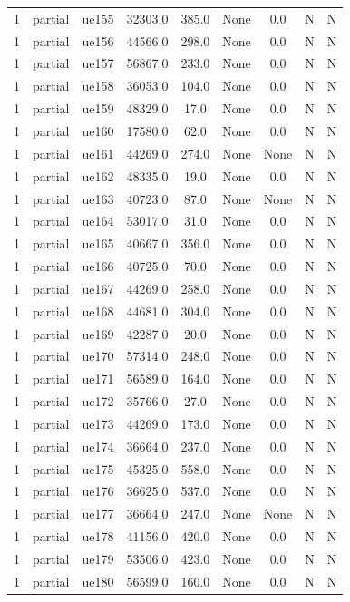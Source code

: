 \begin{table}[ht]
\begin{tabular}{|c|c|c|c|c|c|c|c|c|}
1 & partial & ue155 & 32303.0 & 385.0 & None & 0.0 & N & N \\
1 & partial & ue156 & 44566.0 & 298.0 & None & 0.0 & N & N \\
1 & partial & ue157 & 56867.0 & 233.0 & None & 0.0 & N & N \\
1 & partial & ue158 & 36053.0 & 104.0 & None & 0.0 & N & N \\
1 & partial & ue159 & 48329.0 & 17.0 & None & 0.0 & N & N \\
1 & partial & ue160 & 17580.0 & 62.0 & None & 0.0 & N & N \\
1 & partial & ue161 & 44269.0 & 274.0 & None & None & N & N \\
1 & partial & ue162 & 48335.0 & 19.0 & None & 0.0 & N & N \\
1 & partial & ue163 & 40723.0 & 87.0 & None & None & N & N \\
1 & partial & ue164 & 53017.0 & 31.0 & None & 0.0 & N & N \\
1 & partial & ue165 & 40667.0 & 356.0 & None & 0.0 & N & N \\
1 & partial & ue166 & 40725.0 & 70.0 & None & 0.0 & N & N \\
1 & partial & ue167 & 44269.0 & 258.0 & None & 0.0 & N & N \\
1 & partial & ue168 & 44681.0 & 304.0 & None & 0.0 & N & N \\
1 & partial & ue169 & 42287.0 & 20.0 & None & 0.0 & N & N \\
1 & partial & ue170 & 57314.0 & 248.0 & None & 0.0 & N & N \\
1 & partial & ue171 & 56589.0 & 164.0 & None & 0.0 & N & N \\
1 & partial & ue172 & 35766.0 & 27.0 & None & 0.0 & N & N \\
1 & partial & ue173 & 44269.0 & 173.0 & None & 0.0 & N & N \\
1 & partial & ue174 & 36664.0 & 237.0 & None & 0.0 & N & N \\
1 & partial & ue175 & 45325.0 & 558.0 & None & 0.0 & N & N \\
1 & partial & ue176 & 36625.0 & 537.0 & None & 0.0 & N & N \\
1 & partial & ue177 & 36664.0 & 247.0 & None & None & N & N \\
1 & partial & ue178 & 41156.0 & 420.0 & None & 0.0 & N & N \\
1 & partial & ue179 & 53506.0 & 423.0 & None & 0.0 & N & N \\
1 & partial & ue180 & 56599.0 & 160.0 & None & 0.0 & N & N \\

\end{tabular}
\end{table}
